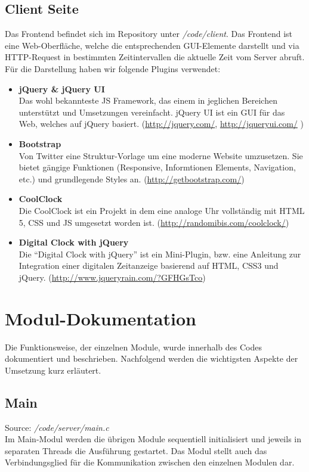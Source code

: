 \subsection{Client Seite}
Das Frontend befindet sich im Repository unter \textit{/code/client}. Das Frontend ist eine Web-Oberfläche, welche die entsprechenden GUI-Elemente darstellt und via HTTP-Request in bestimmten Zeitintervallen die aktuelle Zeit vom Server abruft.\\

Für die Darstellung haben wir folgende Plugins verwendet:
\begin{itemize}
\item \textbf{jQuery \& jQuery UI}\\
Das wohl bekannteste JS Framework, das einem in jeglichen Bereichen unterstützt und Umsetzungen vereinfacht. jQuery UI ist ein GUI für das Web, welches auf jQuery basiert. (\url{http://jquery.com/}, \url{http://jqueryui.com/} )

\item \textbf{Bootstrap}\\
Von Twitter eine Struktur-Vorlage um eine moderne Website umzusetzen. Sie bietet gängige Funktionen (Responsive, Informtionen Elements, Navigation, etc.) und grundlegende Styles an. (\url{http://getbootstrap.com/})

\item \textbf{CoolClock}\\
Die CoolClock ist ein Projekt in dem eine analoge Uhr vollständig mit HTML 5, CSS und JS umgesetzt worden ist. (\url{http://randomibis.com/coolclock/})

\item \textbf{Digital Clock with jQuery}\\
Die "`Digital Clock with jQuery"' ist ein Mini-Plugin, bzw. eine Anleitung zur Integration einer digitalen Zeitanzeige basierend auf HTML, CSS3 und jQuery. (\url{http://www.jqueryrain.com/?GFHGsTco})

\end{itemize}

\section{Modul-Dokumentation}
Die Funktionsweise, der einzelnen Module, wurde innerhalb des Codes dokumentiert und beschrieben. Nachfolgend werden die wichtigsten Aspekte der Umsetzung kurz erläutert.

\subsection{Main}
Source: \textit{/code/server/main.c}\\
Im Main-Modul werden die übrigen Module sequentiell initialisiert und jeweils in separaten Threads die Ausführung gestartet. Das Modul stellt auch das Verbindungsglied für die Kommunikation zwischen den einzelnen Modulen dar.

